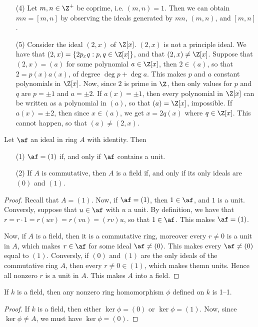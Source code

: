\begin{example}
\begin{enumerate}
          \item[(4)] Let $m,n \in \Z^+$ be coprime, i.e. $(m,n)=1$. Then we can
              obtain $mn=[m,n]$ by observing the ideals generated by $mn$,
              $(m,n)$, and $[m,n]$.

         \item[(5)] Consider the ideal $(2,x)$ of $\Z[x]$. $(2,x)$ is not a
             principle ideal. We have that $(2,x)=\{2p_xq : p,q \in \Z[x]\}$,
             and that $(2,x) \neq \Z[x]$. Suppose that $(2,x)=(a)$ for some
             polynomial $a \in \Z[x]$, then $2 \in (a)$, so that $2=p(x)a(x)$,
             of degree $\deg{p}+\deg{a}$. This makes $p$ and $a$ constant
             polynomials in $\Z[x]$. Now, since $2$ is prime in $\Z$, then only
             values for $p$ and  $q$ are  $p=\pm1$ and $a=\pm2$. If $a(x)=\pm1$,
             then every polynomial in $\Z[x]$ can be written as a polynomial in
             $(a)$, so that $(a)=\Z[x]$, impossible. If $a(x)=\pm2$, then since
             $x \in (a)$, we get $x=2q(x)$ where $q \in \Z[x]$. This cannot
             happen, so that $(a) \neq (2,x)$.
    \end{enumerate}
\end{example}

\begin{lemma}\label{1.4.1}
    Let $\af$ an ideal in ring $A$ with identity. Then
    \begin{enumerate}
        \item[(1)] $\af=(1)$ if, and only if $\af$ contains a unit.

        \item[(2)] If $A$ is commutative, then $A$ is a field if, and only if
            its only ideals are $(0)$ and $(1)$.
    \end{enumerate}
\end{lemma}
\begin{proof}
    Recall that $A=(1)$. Now, if $\af=(1)$, then $1 \in \af$, and  $1$ is a unit.
    Conversly, suppose that $u \in \af$ with $u$ a unit. By definition, we have
    that  $r=r \cdot 1=r(uv)=r(vu)=(rv)u$, so that $1 \in \af$. This makes
    $\af=(1)$.

    Now, if $A$ is a field, then it is a commutative ring, moreover every  $r
    \neq 0$ is a unit in $A$, which makes $r \in \af$ for some ideal $\af \neq
    (0)$. This makes every $\af \neq (0)$ equal to $(1)$. Conversly, if $(0)$ and
    $(1)$ are the only ideals of the commutative ring $A$, then every $r \neq 0
    \in (1)$, which makes themn units. Hence all nonzero $r$ is a unit in $A$.
    This makes $A$ into a field.
\end{proof}
\begin{corollary}
    If $k$ is a field, then any nonzero ring homomorphism $\phi$ defined on $k$
    is 1--1.
\end{corollary}
\begin{proof}
    If $k$ is a field, then either $\ker{\phi}=(0)$ or $\ker{\phi}=(1)$. Now,
    since $\ker{\phi} \neq A$, we must have $\ker{\phi}=(0)$.
\end{proof}

